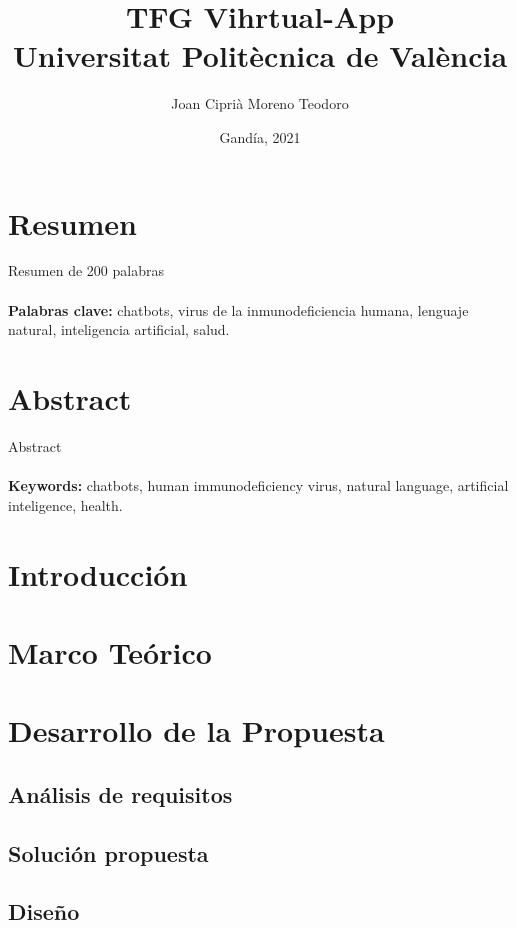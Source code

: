 \documentclass[11pt,a4paper]{book}
\title{
{TFG Vihrtual-App}\\
{\large Universitat Politècnica de València}\\
}
\author{Joan Ciprià Moreno Teodoro}
\date{Gandía, 2021}
\begin{document}
\maketitle

\chapter*{Resumen}
Resumen de 200 palabras
\\
\\
\textbf{Palabras clave:} chatbots, virus de la inmunodeficiencia humana, lenguaje natural, inteligencia artificial, salud.

\chapter*{Abstract}
Abstract
\\
\\
\textbf{Keywords:} chatbots, human immunodeficiency virus, natural language, artificial inteligence, health. 

\tableofcontents

\chapter{Introducción}


\chapter{Marco Teórico}


\chapter{Desarrollo de la Propuesta}

\section{Análisis de requisitos}


\section{Solución propuesta}


\section{Diseño}

\end{document}
